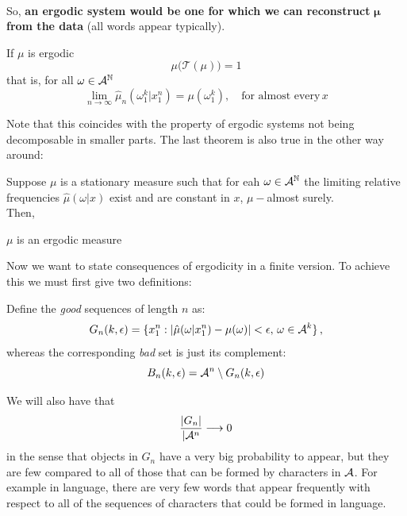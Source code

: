\\So, \textbf{an ergodic system would be one for which we can reconstruct} $\mathbf{\mu}$ \textbf{from the data} (all words appear typically). 
\begin{theorem}
    If $\mu$ is ergodic 
    \begin{equation}
        \mu\big( \mathcal{T}(\mu) \big) = 1
    \end{equation}
    that is, for all $\omega \in \mathcal{A}^{\mathbb{N}}$
    \begin{equation*}
        \lim_{n \rightarrow \infty} \hat{\mu}_n (\omega_1^k | x_1^n) = \mu(\omega_1^k), \quad \text{for almost every} \, x
    \end{equation*}
\end{theorem}
Note that this coincides with the property of ergodic systems not being decomposable in smaller parts. 
The last theorem is also true in the other way around:
\begin{theorem}
    Suppose $\mu$ is a stationary measure such that for eah $\omega \in \mathcal{A}^{\mathbb{N}}$ the limiting relative frequencies $\hat{\mu}(\omega|x)$ exist and are constant in $x$, $\mu-$almost surely.
    \\Then,
    \begin{center}
        $\mu$ is an ergodic measure
    \end{center}
\end{theorem}
Now we want to state consequences of ergodicity in a finite version. To achieve this we must first give two definitions:
\begin{definition}
    Define the \textit{good} sequences of length $n$ as:
    \begin{equation}
        G_n (k, \epsilon) = \{ x_1^n : |\hat{\mu} (\omega | x_1^n) - \mu(\omega)| < \epsilon, \, \omega \in \mathcal{A}^k \} \, ,
    \end{equation}
    whereas the corresponding \textit{bad} set is just its complement:
    \begin{equation*}
        B_n (k, \epsilon) = \mathcal{A}^n \setminus G_n (k, \epsilon)
    \end{equation*}
\end{definition} 
We will also have that 
\begin{equation*}
    \frac{|G_n|}{|\mathcal{A}^n} \longrightarrow 0
\end{equation*}
in the sense that objects in $G_n$ have a very big probability to appear, but they are few compared to all of those that can be formed by characters in $\mathcal{A}$. For example in language, there are very few words that appear frequently with respect to all of the sequences of characters that could be formed in language.
